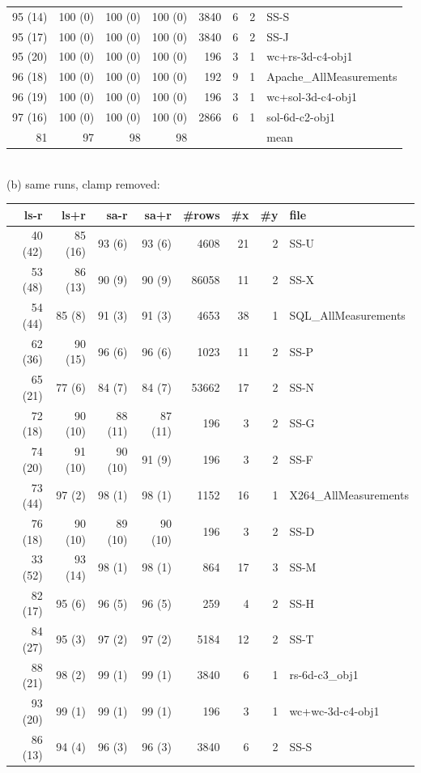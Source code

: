 \documentclass[AMA,STIX2COL]{WileyNJDv5}
\begin{document}
\begin{table}[t]
\begin{tabular}{rrrrrrrl}
 95 (14) & 100 (0) & 100 (0) & 100 (0) & 3840 & 6 & 2 & SS-S \\
 95 (17) & 100 (0) & 100 (0) & 100 (0) & 3840 & 6 & 2 & SS-J \\
 95 (20) & 100 (0) & 100 (0) & 100 (0) & 196 & 3 & 1 & wc+rs-3d-c4-obj1 \\
 96 (18) & 100 (0) & 100 (0) & 100 (0) & 192 & 9 & 1 & Apache\_AllMeasurements \\
 96 (19) & 100 (0) & 100 (0) & 100 (0) & 196 & 3 & 1 & wc+sol-3d-c4-obj1 \\
 97 (16) & 100 (0) & 100 (0) & 100 (0) & 2866 & 6 & 1 & sol-6d-c2-obj1 \\
\midrule
 81 & 97 & 98 & 98 & & & & mean \\
\end{tabular}\\[8pt]
(b) same runs, clamp removed:\\[2pt]
\begin{tabular}{rrrrrrrl}
ls-r & ls+r & sa-r & sa+r & \#rows & \#x & \#y & file \\
\midrule
 40 (42) & 85 (16) & 93 (6) & 93 (6) & 4608 & 21 & 2 & SS-U \\
 53 (48) & 86 (13) & 90 (9) & 90 (9) & 86058 & 11 & 2 & SS-X \\
 54 (44) & 85 (8) & 91 (3) & 91 (3) & 4653 & 38 & 1 & SQL\_AllMeasurements \\
 62 (36) & 90 (15) & 96 (6) & 96 (6) & 1023 & 11 & 2 & SS-P \\
 65 (21) & 77 (6) & 84 (7) & 84 (7) & 53662 & 17 & 2 & SS-N \\
 72 (18) & 90 (10) & 88 (11) & 87 (11) & 196 & 3 & 2 & SS-G \\
 74 (20) & 91 (10) & 90 (10) & 91 (9) & 196 & 3 & 2 & SS-F \\
 73 (44) & 97 (2) & 98 (1) & 98 (1) & 1152 & 16 & 1 & X264\_AllMeasurements \\
 76 (18) & 90 (10) & 89 (10) & 90 (10) & 196 & 3 & 2 & SS-D \\
 33 (52) & 93 (14) & 98 (1) & 98 (1) & 864 & 17 & 3 & SS-M \\
 82 (17) & 95 (6) & 96 (5) & 96 (5) & 259 & 4 & 2 & SS-H \\
 84 (27) & 95 (3) & 97 (2) & 97 (2) & 5184 & 12 & 2 & SS-T \\
 88 (21) & 98 (2) & 99 (1) & 99 (1) & 3840 & 6 & 1 & rs-6d-c3\_obj1 \\
 93 (20) & 99 (1) & 99 (1) & 99 (1) & 196 & 3 & 1 & wc+wc-3d-c4-obj1 \\
 86 (13) & 94 (4) & 96 (3) & 96 (3) & 3840 & 6 & 2 & SS-S \\

\end{tabular}
\end{table}
\end{document}

